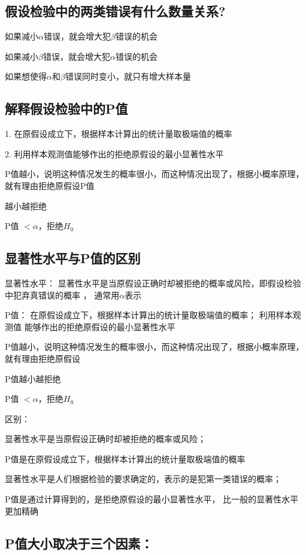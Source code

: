 \documentclass[UTF8,10pt]{book}
\begin{document}
{    \subsection{假设检验中的两类错误有什么数量关系?}	
    如果减小$\alpha$错误，就会增大犯$\beta$错误的机会
    
    如果减小$\beta$错误，就会增大犯$\alpha$错误的机会 
    
    如果想使得$\alpha$和$\beta$错误同时变小，就只有增大样本量

    \subsection{解释假设检验中的P值}	
    1. 在原假设成立下，根据样本计算出的统计量取极端值的概率 
    
    2. 利用样本观测值能够作出的拒绝原假设的最小显著性水平 
    
    P值越小，说明这种情况发生的概率很小，而这种情况出现了，根据小概率原理，
    就有理由拒绝原假设P值
    
    越小越拒绝
    
    P值 $< \alpha$，拒绝$H_0$

    \subsection{显著性水平与P值的区别}	
    显著性水平： 显著性水平是当原假设正确时却被拒绝的概率或风险，即假设检验中犯弃真错误的概率  ，   通常用$\alpha$表示 
    
    P值：    在原假设成立下，根据样本计算出的统计量取极端值的概率；    利用样本观测值 能够作出的拒绝原假设的最小显著性水平 
    
    P值越小，说明这种情况发生的概率很小，而这种情况出现了，根据小概率原理，
    就有理由拒绝原假设
    
    P值越小越拒绝
    
    P值 $ < \alpha$，拒绝$H_0$ 
    
    区别： 
    
    显著性水平是当原假设正确时却被拒绝的概率或风险；
    
    P值是在原假设成立下，根据样本计算出的统计量取极端值的概率
    
    显著性水平是人们根据检验的要求确定的，表示的是犯第一类错误的概率；
    
    P值是通过计算得到的，是拒绝原假设的最小显著性水平，
    比一般的显著性水平更加精确
    
    \subsection{P值大小取决于三个因素： }
    
}
\end{document}
